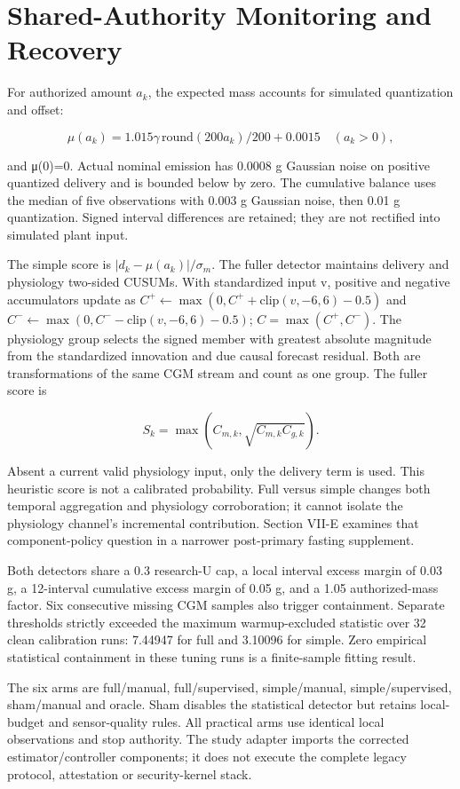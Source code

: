 \documentclass[journal,10pt,letterpaper]{IEEEtran}
\begin{document}
\section{Shared-Authority Monitoring and Recovery}

For authorized amount \(a_k\), the expected mass accounts for simulated
quantization and offset:

\[
\mu(a_k)=1.015\gamma\,\mathrm{round}(200a_k)/200+0.0015\quad(a_k>0), \tag{4}
\]

and μ(0)=0. Actual nominal emission has 0.0008 g Gaussian noise on
positive quantized delivery and is bounded below by zero. The cumulative
balance uses the median of five observations with 0.003 g Gaussian
noise, then 0.01 g quantization. Signed interval differences are
retained; they are not rectified into simulated plant input.

The simple score is \(|d_k-\mu(a_k)|/\sigma_m\). The fuller detector
maintains delivery and physiology two-sided CUSUMs. With standardized
input v, positive and negative accumulators update as
\(C^+\leftarrow\max(0,C^++\mathrm{clip}(v,-6,6)-0.5)\) and
\(C^-\leftarrow\max(0,C^--\mathrm{clip}(v,-6,6)-0.5)\);
\(C=\max(C^+,C^-)\). The physiology group selects the signed member with
greatest absolute magnitude from the standardized innovation and due
causal forecast residual. Both are transformations of the same CGM
stream and count as one group. The fuller score is

\[
S_k=\max(C_{m,k},\sqrt{C_{m,k}C_{g,k}}). \tag{5}
\]

Absent a current valid physiology input, only the delivery term is used.
This heuristic score is not a calibrated probability. Full versus simple
changes both temporal aggregation and physiology corroboration; it
cannot isolate the physiology channel's incremental contribution.
Section VII-E examines that component-policy question in a narrower
post-primary fasting supplement.

Both detectors share a 0.3 research-U cap, a local interval excess
margin of 0.03 g, a 12-interval cumulative excess margin of 0.05 g, and
a 1.05 authorized-mass factor. Six consecutive missing CGM samples also
trigger containment. Separate thresholds strictly exceeded the maximum
warmup-excluded statistic over 32 clean calibration runs: 7.44947 for
full and 3.10096 for simple. Zero empirical statistical containment in
these tuning runs is a finite-sample fitting result.

The six arms are full/manual, full/supervised, simple/manual,
simple/supervised, sham/manual and oracle. Sham disables the statistical
detector but retains local-budget and sensor-quality rules. All
practical arms use identical local observations and stop authority. The
study adapter imports the corrected estimator/controller components; it
does not execute the complete legacy protocol, attestation or
security-kernel stack.
\end{document}
